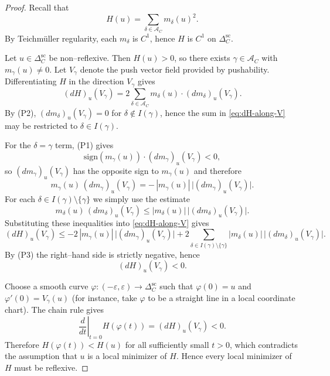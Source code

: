 \documentclass[a4paper,12pt]{amsart}
\theoremstyle{plain}
\theoremstyle{definition}
\begin{document}
\begin{proof}
Recall that
\[
H(u)=\sum_{\delta\in\mathcal A_C} m_\delta(u)^2.
\]
By Teichm\"uller regularity, each $m_\delta$ is $C^1$, hence $H$ is $C^1$ on $\Delta_C^{\mathrm{sc}}$.

Let $u\in\Delta_C^{\mathrm{sc}}$ be non--reflexive. Then $H(u)>0$, so there exists $\gamma\in\mathcal A_C$ with
$m_\gamma(u)\neq 0$. Let $V_\gamma$ denote the push vector field provided by pushability.
Differentiating $H$ in the direction $V_\gamma$ gives
\begin{equation}\label{eq:dH-along-V}
(dH)_u(V_\gamma)
=2\sum_{\delta\in\mathcal A_C} m_\delta(u)\cdot (dm_\delta)_u(V_\gamma).
\end{equation}
By \textup{(P2)}, $(dm_\delta)_u(V_\gamma)=0$ for $\delta\notin I(\gamma)$, hence the sum in
\eqref{eq:dH-along-V} may be restricted to $\delta\in I(\gamma)$.

For the $\delta=\gamma$ term, \textup{(P1)} gives
\[
\mathrm{sign}(m_\gamma(u))\cdot (dm_\gamma)_u(V_\gamma)<0,
\]
so $(dm_\gamma)_u(V_\gamma)$ has the opposite sign to $m_\gamma(u)$ and therefore
\[
m_\gamma(u)\,(dm_\gamma)_u(V_\gamma)=-\,|m_\gamma(u)|\,\bigl|(dm_\gamma)_u(V_\gamma)\bigr|.
\]
For each $\delta\in I(\gamma)\setminus\{\gamma\}$ we simply use the estimate
\[
m_\delta(u)\,(dm_\delta)_u(V_\gamma)
\le |m_\delta(u)|\,\bigl|(dm_\delta)_u(V_\gamma)\bigr|.
\]
Substituting these inequalities into \eqref{eq:dH-along-V} gives
\[
(dH)_u(V_\gamma)
\le
-2\,|m_\gamma(u)|\,\bigl|(dm_\gamma)_u(V_\gamma)\bigr|
+2\sum_{\delta\in I(\gamma)\setminus\{\gamma\}}
|m_\delta(u)|\,\bigl|(dm_\delta)_u(V_\gamma)\bigr|.
\]
By \textup{(P3)} the right--hand side is strictly negative, hence
\begin{equation}\label{eq:dH-negative}
(dH)_u(V_\gamma)<0.
\end{equation}

Choose a smooth curve $\varphi:(-\varepsilon,\varepsilon)\to \Delta_C^{\mathrm{sc}}$ such that
$\varphi(0)=u$ and $\varphi'(0)=V_\gamma(u)$ (for instance, take $\varphi$ to be a straight line in a local coordinate chart).
The chain rule gives
\[
\left.\frac{d}{dt}\right|_{t=0} H(\varphi(t))=(dH)_u(V_\gamma)<0.
\]
Therefore $H(\varphi(t))<H(u)$ for all sufficiently small $t>0$, which contradicts the assumption that $u$ is a
local minimizer of $H$. Hence every local minimizer of $H$ must be reflexive.
\end{proof}

\end{document}
